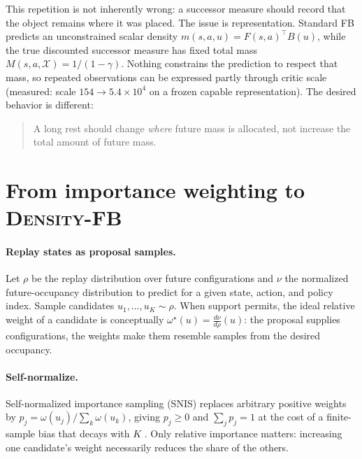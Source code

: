 \documentclass{article}
\newcommand{\DensityFB}{\textsc{Density-FB}}
\begin{document}
This repetition is not inherently wrong: a successor measure should record that the object remains where it was placed.
The issue is representation.
Standard FB \citep{touati2021learning,touati2023does} predicts an unconstrained scalar density $m(s,a,u) = F(s,a)^\top B(u)$, while the true discounted successor measure has fixed total mass $M(s,a,\mathcal X) = 1/(1-\gamma)$.
Nothing constrains the prediction to respect that mass, so repeated observations can be expressed partly through critic scale (measured: scale $154 \to 5.4\times10^4$ on a frozen capable representation).
The desired behavior is different:
\begin{quote}
A long rest should change \emph{where} future mass is allocated, not increase the total amount of future mass.
\end{quote}

\section{From importance weighting to \DensityFB{}}
\label{sec:method}

\paragraph{Replay states as proposal samples.}
Let $\rho$ be the replay distribution over future configurations and $\nu$ the normalized future-occupancy distribution to predict for a given state, action, and policy index.
Sample candidates $u_1,\dots,u_K \sim \rho$.
When support permits, the ideal relative weight of a candidate is conceptually $\omega^\star(u) = \frac{d\nu}{d\rho}(u)$: the proposal supplies configurations, the weights make them resemble samples from the desired occupancy.

\paragraph{Self-normalize.}
Self-normalized importance sampling (SNIS) replaces arbitrary positive weights by $p_j = \omega(u_j)/\sum_k \omega(u_k)$, giving $p_j \ge 0$ and $\sum_j p_j = 1$ at the cost of a finite-sample bias that decays with $K$ \citep{cardoso2022brsnis,kuzborskij2020confident}.
Only relative importance matters: increasing one candidate's weight necessarily reduces the share of the others.
\end{document}
